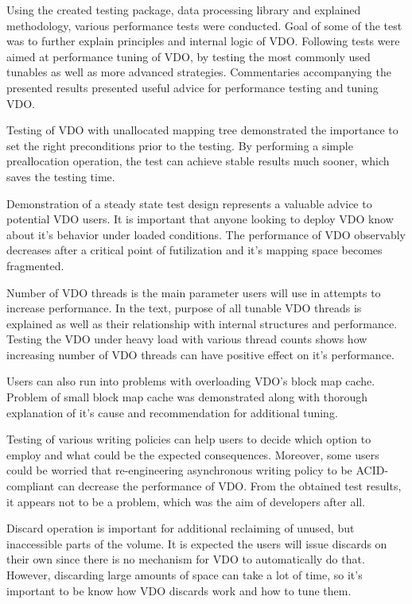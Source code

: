 \documentclass[
  color, %
  table, %
  lof,   %
  lot,   %
]{fithesis3}
\begin{document}
Using the created testing package, data processing library and explained methodology, various performance tests were conducted. Goal of some of the test was to further explain principles and internal logic of VDO. Following tests were aimed at performance tuning of VDO, by testing the most commonly used tunables as well as more advanced strategies. Commentaries accompanying the presented results presented useful advice for performance testing and tuning VDO.

Testing of VDO with unallocated mapping tree demonstrated the importance to set the right preconditions prior to the testing. By performing a simple preallocation operation, the test can achieve stable results much sooner, which saves the testing time.

Demonstration of a steady state test design represents a valuable advice to potential VDO users. It is important that anyone looking to deploy VDO know about it's behavior under loaded conditions. The performance of VDO observably decreases after a critical point of futilization and it's mapping space becomes fragmented.

Number of VDO threads is the main parameter users will use in attempts to increase performance. In the text, purpose of all tunable VDO threads is explained as well as their relationship with internal structures and performance. Testing the VDO under heavy load with various thread counts shows how increasing number of VDO threads can have positive effect on it's performance.

Users can also run into problems with overloading VDO's block map cache. Problem of small block map cache was demonstrated along with thorough explanation of it's cause and recommendation for additional tuning.

Testing of various writing policies can help users to decide which option to employ and what could be the expected consequences. Moreover, some users could be worried that re-engineering asynchronous writing policy to be ACID-compliant can decrease the performance of VDO. From the obtained test results, it appears not to be a problem, which was the aim of developers after all.


Discard operation is important for additional reclaiming of unused, but inaccessible parts of the volume. It is expected the users will issue discards on their own since there is no mechanism for VDO to automatically do that. However, discarding large amounts of space can take a lot of time, so it's important to be know how VDO discards work and how to tune them.
\end{document}

